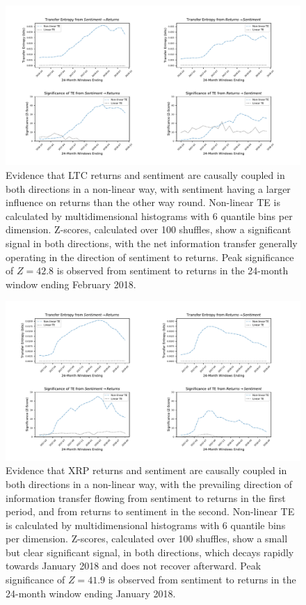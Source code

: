 \documentclass[]{rsos}%
\begin{document}
{\begin{figure}[!htbp]
    \includegraphics[width=\linewidth]{images/LTC.pdf} 
    \caption{Evidence that LTC returns and sentiment are causally coupled in both directions in a non-linear way, with sentiment having a larger influence on returns than the other way round. Non-linear TE is calculated by multidimensional histograms with 6 quantile bins per dimension. Z-scores, calculated over 100 shuffles, show a significant signal in both directions, with the net information transfer generally operating in the direction of sentiment to returns. Peak significance of $Z=42.8$ is observed from sentiment to returns in the 24-month window ending February 2018.}
    \label{fig:LTC_TE}
    \vspace{-4pt}
  \end{figure}

  \begin{figure}[!htbp]
    \includegraphics[width=\linewidth]{images/XRP.pdf}
    \caption{Evidence that XRP returns and sentiment are causally coupled in both directions in a non-linear way, with the prevailing direction of information transfer flowing from sentiment to returns in the first period, and from returns to sentiment in the second. Non-linear TE is calculated by multidimensional histograms with 6 quantile bins per dimension. Z-scores, calculated over 100 shuffles, show a small but clear significant signal, in both directions, which decays rapidly towards January 2018 and does not recover afterward. Peak significance of $Z=41.9$ is observed from sentiment to returns in the 24-month window ending January 2018.}
    \label{fig:XRP_TE}


\end{figure}}
\end{document}
